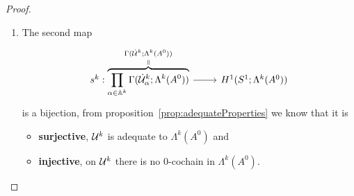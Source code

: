 \begin{proof}
\begin{enumerate}
\begin{comment}
                ODE-Theory, says that a germ defines a solution in a
                \textbf{neighbourhood}
              \item \PROBLEM[why is the neighbourhood large enough?] I.e.\
                \[
                  \substack{the\\neighbourhood}\supset\cU_\alpha^k \,?
                \]
            \end{itemize}
          \item $U_\alpha^k$ is the largest arc, to contain no corresponding
            Stokes ray
            \begin{itemize}
              \item Then might \cite[Lemma 1]{BJL1979Birkhoff} on p.\ 73 help
            \end{itemize}
          \item Every arc $U\in\dot\cU_\alpha^k$ has the width $\frac{\pi}{k}$
            and is delimited by Stokes directions.
          \item maybe follows from \cite[Prop.1.24]{thboalch}
          \item \textbf{See \cite{babbitt1989local}}
          \item See \cite[375]{Martinet1991} and
            \cite[Def.5 on 372]{Martinet1991}
        \end{itemize}
      \end{comment}
    \item The second map
      \[ \begin{tikzcd}
        s^k:
        \overset{\Gamma(\dot\cU^k;\Lambda^k(A^0))}{%
          \overset{\text{\rotatebox[origin=c]{-90}{$=$}}}{%
            \overbrace{%
              \prod_{\alpha\in\A^k}\Gamma(\dot\cU_\alpha^k;\Lambda^k(A^0))
            }
        }}
        \rar &
        H^1(S^1;\Lambda^k(A^0))
      \end{tikzcd} \]
      is a bijection,  from
      proposition~\ref{prop:adequateProperties} we know that it is
      \begin{itemize}
        \item \textbf{surjective},  $\mathcal{U}^k$ is adequate to
          $\Lambda^k(A^0)$ and
        \item \textbf{injective},  on $\mathcal{U}^k$ there is no
          $0$-cochain in $\Lambda^k(A^0)$.
      \end{itemize}
  \end{enumerate}
  \PROBLEM[Naturality?]
\end{proof}

